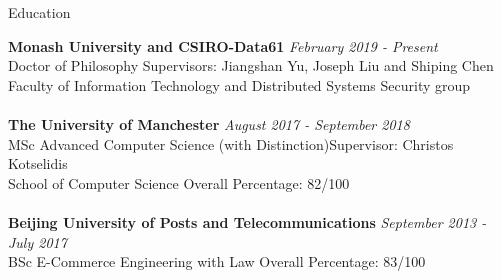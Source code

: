 \documentclass{resume} %
\begin{document}

\begin{rSection}{Education}

{\bf Monash University and CSIRO-Data61} \hfill {\em February 2019 - Present} 
\\ Doctor of Philosophy\hfill { Supervisors: Jiangshan Yu, Joseph Liu and Shiping Chen}
\\ Faculty of Information Technology and Distributed Systems Security group\\
%
\\{\bf The University of Manchester} \hfill {\em August 2017 - September 2018} 
\\ MSc Advanced Computer Science (with Distinction)\hfill {Supervisor: Christos Kotselidis}
\\ School of Computer Science\hfill { Overall Percentage: 82/100 }\\
%
\\{\bf Beijing University of Posts and Telecommunications} \hfill {\em September 2013 - July 2017} 
\\ BSc E-Commerce Engineering with Law\hfill { Overall Percentage: 83/100 }


\end{rSection}
\end{document}
